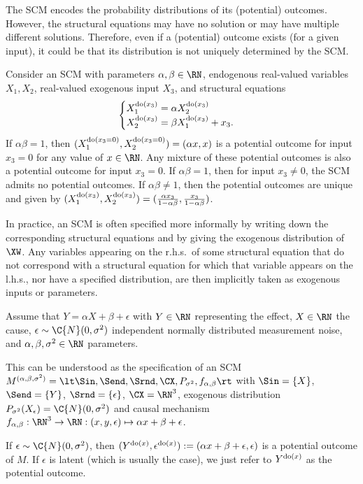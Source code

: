 The SCM encodes the probability distributions of its (potential) outcomes.
However, the structural equations  may have no solution or may have multiple different solutions.
Therefore, even if a (potential) outcome exists (for a given input), it could be that its distribution is not uniquely determined by the SCM.
\begin{Eg}
Consider an SCM with parameters $\alpha,\beta \in \RN$, endogenous real-valued variables $X_1,X_2$, real-valued exogenous input $X_3$, and structural equations
$$\begin{cases}
  X_1^{\operatorname{do}(x_3)} = \alpha X_2^{\operatorname{do}(x_3)} & \\
  X_2^{\operatorname{do}(x_3)} = \beta X_1^{\operatorname{do}(x_3)} + x_3. &
\end{cases}$$
  If $\alpha \beta = 1$, then $(X_1^{\operatorname{do}(x_3=0)},X_2^{\operatorname{do}(x_3=0)}) = (\alpha x,x)$ is a potential outcome for input $x_3=0$ for any value of $x\in\RN$. Any mixture of these potential outcomes is also a potential outcome for input  $x_3=0$.
  If $\alpha \beta = 1$, then for input $x_3 \ne 0$, the SCM admits no potential outcomes.
  If $\alpha \beta \ne 1$, then the potential outcomes are unique and given by
  $(X_1^{\operatorname{do}(x_3)},X_2^{\operatorname{do}(x_3)}) = (\frac{\alpha x_3}{1 - \alpha\beta},\frac{x_3}{1 - \alpha\beta})$.
\end{Eg}

In practice, an SCM is often specified more informally by writing down the corresponding structural
equations and by giving the exogenous distribution of $\XW$. 
Any variables appearing
on the r.h.s.\ of some structural equation that do not correspond with a structural equation for which
that variable appears on the l.h.s., nor have a specified distribution, are then implicitly taken as
exogenous inputs or parameters.
\begin{Eg}
  Assume that $Y = \alpha X + \beta + \epsilon$ with $Y \in \RN$ representing the effect, $X \in \RN$
  the cause, $\epsilon \sim \C{N}(0,\sigma^2)$ independent normally distributed measurement noise, and
  $\alpha,\beta,\sigma^2 \in \RN$ parameters.

  This can be understood as the specification of an SCM
  $M^{(\alpha,\beta,\sigma^2)} = \lt \Sin, \Send, \Srnd, \CX, P_{\sigma^2}, f_{\alpha,\beta} \rt$ 
  with $\Sin = \{X\}$, $\Send = \{Y\}$, $\Srnd = \{\epsilon\}$, $\CX = \RN^3$, 
  exogenous distribution $P_{\sigma^2}(X_\epsilon) = \C{N}(0,\sigma^2)$
  and causal mechanism $f_{\alpha,\beta} : \RN^3 \to \RN : (x,y,\epsilon) \mapsto \alpha x + \beta + \epsilon$.

  If $\epsilon \sim \C{N}(0,\sigma^2)$, then $(Y^{\operatorname{do}(x)},\epsilon^{\operatorname{do}(x)}) := (\alpha x + \beta + \epsilon, \epsilon)$ is
  a potential outcome of $M$. 
  If $\epsilon$ is latent (which is usually the case), we just refer to $Y^{\operatorname{do}(x)}$ as the potential outcome.
\end{Eg}

